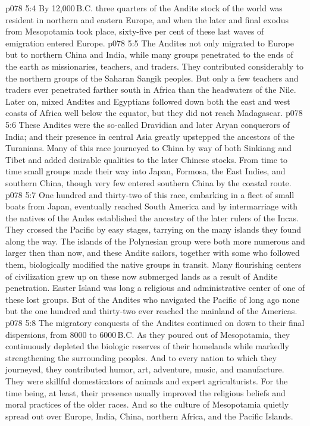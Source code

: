 \vs p078 5:4 \pc By 12,000\,B.C. three quarters of the Andite stock of the world was resident in northern and eastern Europe, and when the later and final exodus from Mesopotamia took place, sixty\hyp{}five per cent of these last waves of emigration entered Europe.
\vs p078 5:5 \pc The Andites not only migrated to Europe but to northern China and India, while many groups penetrated to the ends of the earth as missionaries, teachers, and traders. They contributed considerably to the northern groups of the Saharan Sangik peoples. But only a few teachers and traders ever penetrated farther south in Africa than the headwaters of the Nile. Later on, mixed Andites and Egyptians followed down both the east and west coasts of Africa well below the equator, but they did not reach Madagascar.
\vs p078 5:6 These Andites were the so\hyp{}called Dravidian and later Aryan conquerors of India; and their presence in central Asia greatly upstepped the ancestors of the Turanians. Many of this race journeyed to China by way of both Sinkiang and Tibet and added desirable qualities to the later Chinese stocks. From time to time small groups made their way into Japan, Formosa, the East Indies, and southern China, though very few entered southern China by the coastal route.
\vs p078 5:7 One hundred and thirty\hyp{}two of this race, embarking in a fleet of small boats from Japan, eventually reached South America and by intermarriage with the natives of the Andes established the ancestry of the later rulers of the Incas. They crossed the Pacific by easy stages, tarrying on the many islands they found along the way. The islands of the Polynesian group were both more numerous and larger then than now, and these Andite sailors, together with some who followed them, biologically modified the native groups in transit. Many flourishing centers of civilization grew up on these now submerged lands as a result of Andite penetration. Easter Island was long a religious and administrative center of one of these lost groups. But of the Andites who navigated the Pacific of long ago none but the one hundred and thirty\hyp{}two ever reached the mainland of the Americas.
\vs p078 5:8 \pc The migratory conquests of the Andites continued on down to their final dispersions, from 8000 to 6000\,B.C. As they poured out of Mesopotamia, they continuously depleted the biologic reserves of their homelands while markedly strengthening the surrounding peoples. And to every nation to which they journeyed, they contributed humor, art, adventure, music, and manufacture. They were skillful domesticators of animals and expert agriculturists. For the time being, at least, their presence usually improved the religious beliefs and moral practices of the older races. And so the culture of Mesopotamia quietly spread out over Europe, India, China, northern Africa, and the Pacific Islands.
